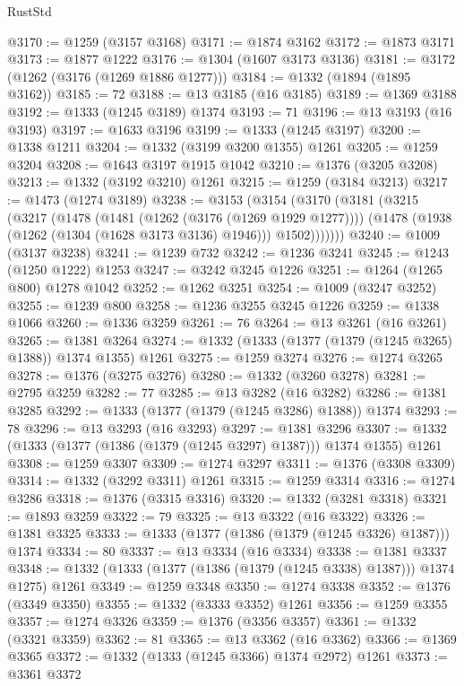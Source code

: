 \begin{lexlean}{RustStd}
\begin{coremodule}
@3170 := @1259 (@3157 @3168)
@3171 := @1874 @3162
@3172 := @1873 @3171
@3173 := @1877 @1222
@3176 := @1304 (@1607 @3173 @3136)
@3181 := @3172 (@1262 (@3176 (@1269 @1886 @1277)))
@3184 := @1332 (@1894 (@1895 @3162))
@3185 := 72
@3188 := @13 @3185 (@16 @3185)
@3189 := @1369 @3188
@3192 := @1333 (@1245 @3189) @1374
@3193 := 71
@3196 := @13 @3193 (@16 @3193)
@3197 := @1633 @3196
@3199 := @1333 (@1245 @3197)
@3200 := @1338 @1211
@3204 := @1332 (@3199 @3200 @1355) @1261
@3205 := @1259 @3204
@3208 := @1643 @3197 @1915 @1042
@3210 := @1376 (@3205 @3208)
@3213 := @1332 (@3192 @3210) @1261
@3215 := @1259 (@3184 @3213)
@3217 := @1473 (@1274 @3189)
@3238 := @3153
    (@3154
      (@3170
        (@3181
          (@3215
            (@3217
              (@1478
                (@1481 (@1262 (@3176 (@1269 @1929 @1277))))
                (@1478 (@1938 (@1262 (@1304 (@1628 @3173 @3136) @1946))) @1502)))))))
@3240 := @1009 (@3137 @3238)
@3241 := @1239 @732
@3242 := @1236 @3241
@3245 := @1243 (@1250 @1222) @1253
@3247 := @3242 @3245 @1226
@3251 := @1264 (@1265 @800) @1278 @1042
@3252 := @1262 @3251
@3254 := @1009 (@3247 @3252)
@3255 := @1239 @800
@3258 := @1236 @3255 @3245 @1226
@3259 := @1338 @1066
@3260 := @1336 @3259
@3261 := 76
@3264 := @13 @3261 (@16 @3261)
@3265 := @1381 @3264
@3274 := @1332 (@1333 (@1377 (@1379 (@1245 @3265) @1388)) @1374 @1355) @1261
@3275 := @1259 @3274
@3276 := @1274 @3265
@3278 := @1376 (@3275 @3276)
@3280 := @1332 (@3260 @3278)
@3281 := @2795 @3259
@3282 := 77
@3285 := @13 @3282 (@16 @3282)
@3286 := @1381 @3285
@3292 := @1333 (@1377 (@1379 (@1245 @3286) @1388)) @1374
@3293 := 78
@3296 := @13 @3293 (@16 @3293)
@3297 := @1381 @3296
@3307 := @1332 (@1333 (@1377 (@1386 (@1379 (@1245 @3297) @1387))) @1374 @1355) @1261
@3308 := @1259 @3307
@3309 := @1274 @3297
@3311 := @1376 (@3308 @3309)
@3314 := @1332 (@3292 @3311) @1261
@3315 := @1259 @3314
@3316 := @1274 @3286
@3318 := @1376 (@3315 @3316)
@3320 := @1332 (@3281 @3318)
@3321 := @1893 @3259
@3322 := 79
@3325 := @13 @3322 (@16 @3322)
@3326 := @1381 @3325
@3333 := @1333 (@1377 (@1386 (@1379 (@1245 @3326) @1387))) @1374
@3334 := 80
@3337 := @13 @3334 (@16 @3334)
@3338 := @1381 @3337
@3348 := @1332 (@1333 (@1377 (@1386 (@1379 (@1245 @3338) @1387))) @1374 @1275) @1261
@3349 := @1259 @3348
@3350 := @1274 @3338
@3352 := @1376 (@3349 @3350)
@3355 := @1332 (@3333 @3352) @1261
@3356 := @1259 @3355
@3357 := @1274 @3326
@3359 := @1376 (@3356 @3357)
@3361 := @1332 (@3321 @3359)
@3362 := 81
@3365 := @13 @3362 (@16 @3362)
@3366 := @1369 @3365
@3372 := @1332 (@1333 (@1245 @3366) @1374 @2972) @1261
@3373 := @3361 @3372

\end{coremodule}
\end{lexlean}
